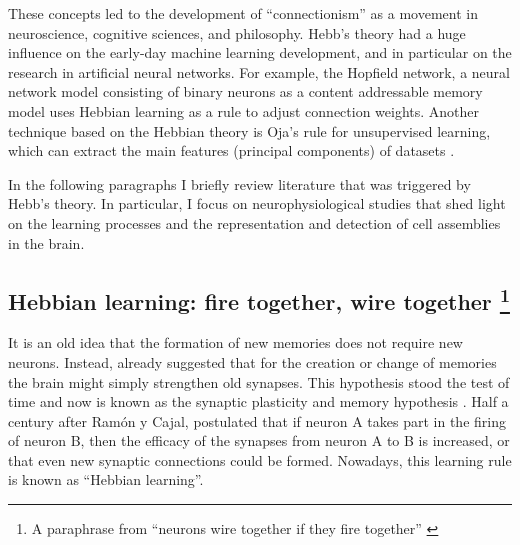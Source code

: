   These concepts led to the development of ``connectionism'' as a movement in
  neuroscience, cognitive sciences, and philosophy. Hebb's theory had a huge
  influence on the early-day machine learning development, and in particular on
  the research in artificial neural networks. For example, the Hopfield
  network, a neural network model consisting of binary neurons as a content
  addressable memory model \citep{Hopfield1982} uses Hebbian learning as a rule
  to adjust connection weights. Another technique based on the Hebbian theory
  is Oja's rule for unsupervised learning, which can extract the main features
  (principal components) of datasets \citep{Oja1982}.

  In the following paragraphs I briefly review literature that was triggered by
  Hebb's theory. In particular, I focus on neurophysiological studies that shed
  light on the learning processes and the representation and detection of cell
  assemblies in the brain.
  
  \subsection{Hebbian learning: fire together, wire together {\protect\footnote{A
  paraphrase from ``neurons wire together if they fire together'' \citep{Lowel1992}}}}

    It is an old idea that the formation of new memories does not require new
    neurons. Instead, already \cite{Cajal1894} suggested that for the creation
    or change of memories the brain might simply strengthen old synapses. This
    hypothesis stood the test of time and now is known as the synaptic
    plasticity and memory hypothesis \citep{Martin2000, Takeuchi2014}.  Half a
    century after Ram\'{o}n y Cajal, \cite{Hebb49} postulated that if neuron A
    takes part in the firing of neuron B, then the efficacy of the synapses
    from neuron A to B is increased, or that even new synaptic connections
    could be formed. Nowadays, this learning rule is known as ``Hebbian
    learning''.


